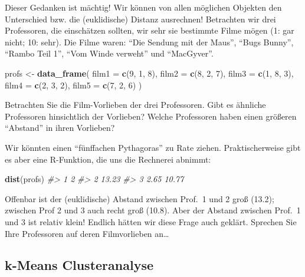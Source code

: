 \documentclass[12pt,ngerman,]{book}
\makeatletter
\newenvironment{Shaded}{\begin{snugshade}}{\end{snugshade}}
\newcommand{\KeywordTok}[1]{\textcolor[rgb]{0.13,0.29,0.53}{\textbf{#1}}}
\newcommand{\DataTypeTok}[1]{\textcolor[rgb]{0.13,0.29,0.53}{#1}}
\newcommand{\DecValTok}[1]{\textcolor[rgb]{0.00,0.00,0.81}{#1}}
\newcommand{\StringTok}[1]{\textcolor[rgb]{0.31,0.60,0.02}{#1}}
\newcommand{\CommentTok}[1]{\textcolor[rgb]{0.56,0.35,0.01}{\textit{#1}}}
\newcommand{\NormalTok}[1]{#1}
\newenvironment{kframe}{%
\medskip{}
\setlength{\fboxsep}{.8em}
 \def\at@end@of@kframe{}%
 \ifinner\ifhmode%
  \def\at@end@of@kframe{\end{minipage}}%
  \begin{minipage}{\columnwidth}%
 \fi\fi%
 \def\FrameCommand##1{\hskip\@totalleftmargin \hskip-\fboxsep
 \colorbox{shadecolor}{##1}\hskip-\fboxsep
     \hskip-\linewidth \hskip-\@totalleftmargin \hskip\columnwidth}%
 \MakeFramed {\advance\hsize-\width
   \@totalleftmargin\z@ \linewidth\hsize
   \@setminipage}}%
 {\par\unskip\endMakeFramed%
 \at@end@of@kframe}
\renewenvironment{Shaded}{\begin{kframe}}{\end{kframe}}
\theoremstyle{definition}
\theoremstyle{definition}
\theoremstyle{remark}
\makeatother
\begin{document}
Dieser Gedanken ist mächtig! Wir können von allen möglichen Objekten den
Unterschied bzw. die (euklidische) Distanz ausrechnen! Betrachten wir
drei Professoren, die einschätzen sollten, wir sehr sie bestimmte Filme
mögen (1: gar nicht; 10: sehr). Die Filme waren: ``Die Sendung mit der
Maus'', ``Bugs Bunny'', ``Rambo Teil 1'', ``Vom Winde verweht'' und
``MacGyver''.

\begin{Shaded}
\begin{Highlighting}[]
\NormalTok{profs <-}\StringTok{ }\KeywordTok{data_frame}\NormalTok{(}
  \DataTypeTok{film1 =} \KeywordTok{c}\NormalTok{(}\DecValTok{9}\NormalTok{, }\DecValTok{1}\NormalTok{, }\DecValTok{8}\NormalTok{),}
  \DataTypeTok{film2 =} \KeywordTok{c}\NormalTok{(}\DecValTok{8}\NormalTok{, }\DecValTok{2}\NormalTok{, }\DecValTok{7}\NormalTok{),}
  \DataTypeTok{film3 =} \KeywordTok{c}\NormalTok{(}\DecValTok{1}\NormalTok{, }\DecValTok{8}\NormalTok{, }\DecValTok{3}\NormalTok{),}
  \DataTypeTok{film4 =} \KeywordTok{c}\NormalTok{(}\DecValTok{2}\NormalTok{, }\DecValTok{3}\NormalTok{, }\DecValTok{2}\NormalTok{),}
  \DataTypeTok{film5 =} \KeywordTok{c}\NormalTok{(}\DecValTok{7}\NormalTok{, }\DecValTok{2}\NormalTok{, }\DecValTok{6}\NormalTok{)}
\NormalTok{)}
\end{Highlighting}
\end{Shaded}

Betrachten Sie die Film-Vorlieben der drei Professoren. Gibt es ähnliche
Professoren hinsichtlich der Vorlieben? Welche Professoren haben einen
größeren ``Abstand'' in ihren Vorlieben?

Wir könnten einen ``fünffachen Pythagoras'' zu Rate ziehen.
Praktischerweise gibt es aber eine R-Funktion, die uns die Rechnerei
abnimmt:

\begin{Shaded}
\begin{Highlighting}[]
\KeywordTok{dist}\NormalTok{(profs)}
\CommentTok{#>       1     2}
\CommentTok{#> 2 13.23      }
\CommentTok{#> 3  2.65 10.77}
\end{Highlighting}
\end{Shaded}

Offenbar ist der (euklidische) Abstand zwischen Prof.~1 und 2 groß
(13.2); zwischen Prof 2 und 3 auch recht groß (10.8). Aber der Abstand
zwischen Prof.~1 und 3 ist relativ klein! Endlich hätten wir diese Frage
auch geklärt. Sprechen Sie Ihre Professoren auf deren Filmvorlieben
an\ldots{}

\subsection{k-Means Clusteranalyse}\label{k-means-clusteranalyse}
\end{document}
